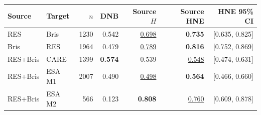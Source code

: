 \begin{tabular*}{\linewidth}{@{\extracolsep{\fill}}llrrrrr@{}}
\toprule
Source & Target & $n$ & DNB & Source $H$ & Source HNE & HNE 95\% CI \\
\midrule
RES & Bris & 1230 & 0.542 & \underline{0.698} & \cellcolor{hnegray}\textbf{0.735} & [0.635, 0.825] \\
Bris & RES & 1964 & 0.479 & \underline{0.789} & \cellcolor{hnegray}\textbf{0.816} & [0.752, 0.869] \\
RES+Bris & CARE & 1399 & \textbf{0.574} & 0.539 & \cellcolor{hnegray}\underline{0.548} & [0.474, 0.631] \\
RES+Bris & ESA M1 & 2007 & 0.490 & \underline{0.498} & \cellcolor{hnegray}\textbf{0.564} & [0.466, 0.660] \\
RES+Bris & ESA M2 & 566 & 0.123 & \textbf{0.808} & \cellcolor{hnegray}\underline{0.760} & [0.609, 0.878] \\
\bottomrule
\end{tabular*}